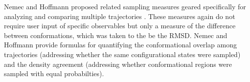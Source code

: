 Nemec and Hoffmann proposed related sampling measures geared specifically for analyzing and comparing multiple trajectories \cite{Nemec2017}.
These measures again do not require user input of specific observables but only a measure of the difference between conformations, which was taken to the be the RMSD.
Nemec and Hoffmann provide formulas for quantifying the conformational overlap among trajectories (addressing whether the same configurational states were sampled) and the density agreement (addressing whether conformational regions were  sampled with equal probabilties).


